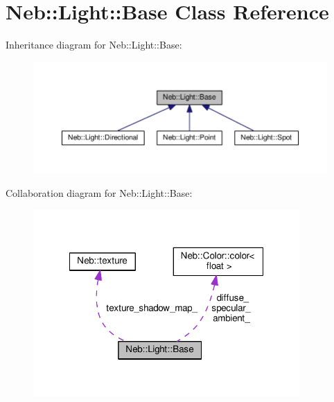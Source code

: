 \hypertarget{classNeb_1_1Light_1_1Base}{\section{Neb\-:\-:Light\-:\-:Base Class Reference}
\label{classNeb_1_1Light_1_1Base}
}


Inheritance diagram for Neb\-:\-:Light\-:\-:Base\-:
\nopagebreak
\begin{figure}[H]
\begin{center}
\leavevmode
\includegraphics[width=350pt]{classNeb_1_1Light_1_1Base__inherit__graph}
\end{center}
\end{figure}


Collaboration diagram for Neb\-:\-:Light\-:\-:Base\-:
\nopagebreak
\begin{figure}[H]
\begin{center}
\leavevmode
\includegraphics[width=288pt]{classNeb_1_1Light_1_1Base__coll__graph}
\end{center}
\end{figure}
